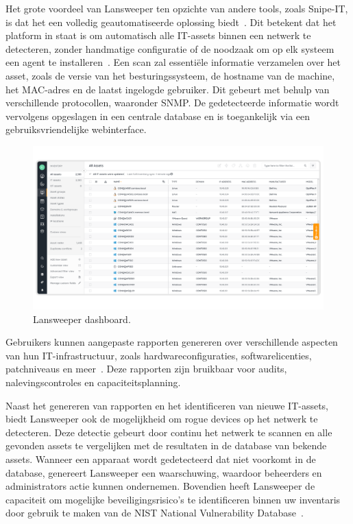 Het grote voordeel van Lansweeper ten opzichte van andere tools, zoals Snipe-IT, is dat het een volledig geautomatiseerde oplossing biedt~\autocite{lansweeper-features}.
Dit betekent dat het platform in staat is om automatisch alle IT-assets binnen een netwerk te detecteren, zonder handmatige configuratie of de noodzaak om op elk systeem een agent te installeren~\autocite{lansweeper-getting-started}.
Een scan zal essenti\"ele informatie verzamelen over het asset, zoals de versie van het besturingssysteem, de hostname van de machine, het MAC-adres en de laatst ingelogde gebruiker.
Dit gebeurt met behulp van verschillende protocollen, waaronder SNMP.
De gedetecteerde informatie wordt vervolgens opgeslagen in een centrale database en is toegankelijk via een gebruiksvriendelijke webinterface.

\begin{figure}[h!]
    \includegraphics[width=\textwidth]
    {./graphics/lansweeper-dashboard.png}
    \caption{\label{fig:lansweeper-dashboard}Lansweeper dashboard.}
\end{figure}

Gebruikers kunnen aangepaste rapporten genereren over verschillende aspecten van hun IT-infrastructuur, zoals hardwareconfiguraties, softwarelicenties, patchniveaus en meer~\autocite{lansweeper-features}.
Deze rapporten zijn bruikbaar voor audits, nalevingscontroles en capaciteitsplanning.

Naast het genereren van rapporten en het identificeren van nieuwe IT-assets, biedt Lansweeper ook de mogelijkheid om rogue devices op het netwerk te detecteren.
Deze detectie gebeurt door continu het netwerk te scannen en alle gevonden assets te vergelijken met de resultaten in de database van bekende assets.
Wanneer een apparaat wordt gedetecteerd dat niet voorkomt in de database, genereert Lansweeper een waarschuwing, waardoor beheerders en administrators actie kunnen ondernemen.
Bovendien heeft Lansweeper de capaciteit om mogelijke beveiligingsrisico's te identificeren binnen uw inventaris door gebruik te maken van de NIST National Vulnerability Database~\autocite{lansweeper-cam}.

